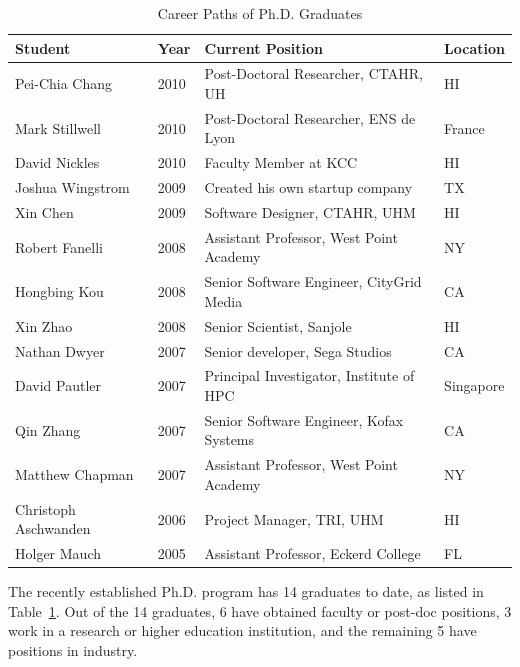 \documentclass[12pt]{article}
\begin{document}
\begin{table}[Htb]
\caption{Career Paths of Ph.D. Graduates}
\label{tab.phd}
\begin{tabular}{|l|l|l|l|}
\hline
Student & Year & Current Position & Location \\
\hline
Pei-Chia Chang & 2010 & Post-Doctoral Researcher, CTAHR, UH & HI \\
Mark Stillwell & 2010 & Post-Doctoral Researcher, ENS de Lyon & France \\
David Nickles & 2010 & Faculty Member at KCC & HI \\
Joshua Wingstrom & 2009 & Created his own startup company & TX\\
Xin Chen & 2009 & Software Designer, CTAHR, UHM & HI\\
Robert Fanelli & 2008 & Assistant Professor, West Point Academy & NY\\
Hongbing Kou & 2008 & Senior Software Engineer, CityGrid Media &  CA\\
Xin Zhao & 2008 & Senior Scientist, Sanjole & HI\\
Nathan Dwyer & 2007 & Senior developer, Sega Studios & CA\\
David Pautler & 2007 & Principal Investigator, Institute of HPC & Singapore\\
Qin Zhang & 2007 & Senior Software Engineer, Kofax Systems & CA\\
Matthew Chapman & 2007 & Assistant Professor, West Point Academy & NY\\
Christoph Aschwanden & 2006 & Project Manager, TRI, UHM & HI\\
Holger Mauch & 2005 & Assistant Professor, Eckerd College & FL\\
\hline
\end{tabular}
\end{table}

The recently established Ph.D. program has 14 graduates to date, as
listed in Table~\ref{tab.phd}.  Out of the 14 graduates, 6 have
obtained faculty or post-doc positions, 3 work in a research or higher education
institution, and the remaining 5 have positions in industry.
\end{document}
